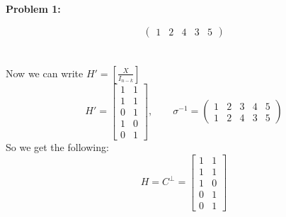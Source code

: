 \documentclass[11pt]{article}
\newenvironment{problem}[1]{\textbf{Problem #1: }}{\newpage}
\begin{document}
\begin{problem}{1}
\begin{enumerate}[label = (\alph*)]
\[\begin{pmatrix}
				1 & 2 & 4 & 3 & 5
			\end{pmatrix} \]
			\\ \\
			Now we can write $H' = \left[\frac{X}{I_{n-k}}\right]$
			\[H' = \left[ \begin{array}{cc}
				1 & 1 \\
				1 & 1 \\
				0 & 1 \\
				1 & 0 \\
				0 & 1
			\end{array}\right], \qquad \sigma^{-1} = \begin{pmatrix}
				1 & 2 & 3 & 4 & 5 \\
				1 & 2 & 4 & 3 & 5
			\end{pmatrix}\]
			So we get the following:
			\[H = C^\perp = \left[ \begin{array}{cc}
				1 & 1 \\
				1 & 1 \\
				1 & 0 \\
				0 & 1 \\
				0 & 1
			\end{array}\right]\]
		\end{enumerate}
	\end{problem}
\end{document}
